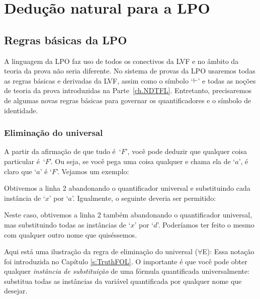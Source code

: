 \part{Dedução natural para a LPO}
\label{ch.NDFOL}

 

\chapter{Regras básicas da LPO}\label{s:BasicFOL}

A linguagem da LPO faz uso de todos os conectivos da LVF e no âmbito da teoria da prova não seria diferente. No sistema de provas da LPO usaremos todas as regras básicas e derivadas da LVF, assim como o símbolo `$\vdash$' e todas as noções de teoria da prova introduzidas na Parte~\ref{ch.NDTFL}. Entretanto, precisaremos de algumas novas regras básicas para governar os quantificadores e o símbolo de identidade. 

 
\section{Eliminação do universal}

A partir da afirmação de que tudo é~`$F$', você pode deduzir que qualquer coisa particular é~`$F$’.  Ou seja, se você pega uma coisa qualquer e chama ela de `$a$', é claro que `$a$' é `$F$'.
Vejamos um exemplo:
\begin{fitchproof}
	 
\end{fitchproof}
 Obtivemos a linha 2 abandonando o quantificador universal e substituindo cada instância de `$x$' por `$a$'. Igualmente, o seguinte deveria ser permitido:
\begin{fitchproof}
	 
\end{fitchproof}
 
Neste caso, obtivemos a linha 2 também abandonando o quantificador universal, mas substituindo todas as instâncias de `$x$' por `$d$'. Poderíamos ter feito o mesmo com qualquer outro nome que quiséssemos.

Aqui está uma ilustração da regra de eliminação do universal ($\forall$E):
Essa notação foi introduzida no Capítulo  \ref{s:TruthFOL}. O importante é que você pode obter qualquer \emph{instância de substituição} de uma fórmula quantificada universalmente: substitua todas as instâncias da variável quantificada por qualquer nome que desejar. 

